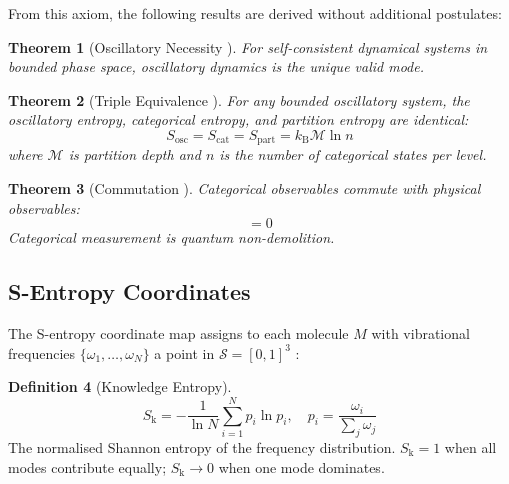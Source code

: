 \documentclass[11pt,twocolumn,a4paper]{article}
\newtheorem{theorem}{Theorem}[section]
\theoremstyle{definition}
\newtheorem{definition}[theorem]{Definition}
\theoremstyle{remark}
\newcommand{\kB}{k_{\mathrm{B}}}
\newcommand{\Sk}{S_{\mathrm{k}}}
\newcommand{\Sspace}{\mathcal{S}}
\newcommand{\Depth}{\mathcal{M}}
\newcommand{\Ocat}{\hat{O}_{\mathrm{cat}}}
\newcommand{\Ophys}{\hat{O}_{\mathrm{phys}}}
\begin{document}
From this axiom, the following results are derived without additional postulates:

\begin{theorem}[Oscillatory Necessity {\citep[Theorem~2.4]{sachikonye2025a}}]
\label{thm:oscillatory}
For self-consistent dynamical systems in bounded phase space, oscillatory dynamics is the unique valid mode.
\end{theorem}

\begin{theorem}[Triple Equivalence {\citep[Theorem~3.2]{sachikonye2025a}}]
\label{thm:triple_equiv}
For any bounded oscillatory system, the oscillatory entropy, categorical entropy, and partition entropy are identical:
\begin{equation}
S_{\mathrm{osc}} = S_{\mathrm{cat}} = S_{\mathrm{part}} = \kB \Depth \ln n
\label{eq:triple_equiv}
\end{equation}
where $\Depth$ is partition depth and $n$ is the number of categorical states per level.
\end{theorem}

\begin{theorem}[Commutation {\citep[Theorem~3.5]{sachikonye2025a}}]
\label{thm:commutation}
Categorical observables commute with physical observables:
\begin{equation}
[\Ocat, \Ophys] = 0
\label{eq:commutation}
\end{equation}
Categorical measurement is quantum non-demolition.
\end{theorem}

\subsection{S-Entropy Coordinates}

The S-entropy coordinate map assigns to each molecule $M$ with vibrational frequencies $\{\omega_1, \ldots, \omega_N\}$ a point in $\Sspace = [0,1]^3$ \citep{sachikonye2025c}:

\begin{definition}[Knowledge Entropy]
\label{def:sk}
\begin{equation}
\Sk = -\frac{1}{\ln N} \sum_{i=1}^{N} p_i \ln p_i, \quad p_i = \frac{\omega_i}{\sum_j \omega_j}
\label{eq:sk}
\end{equation}
The normalised Shannon entropy of the frequency distribution. $\Sk = 1$ when all modes contribute equally; $\Sk \to 0$ when one mode dominates.
\end{definition}
\end{document}
